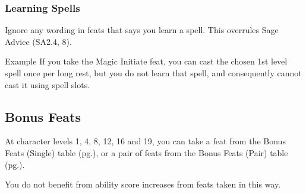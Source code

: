 \documentclass[House_Rules.tex]{subfiles}
\begin{document}
\subsubsection{Learning Spells}
Ignore any wording in feats that says you learn a spell. This overrules Sage Advice (SA2.4, 8).

\begin{DndComment}{Example}
If you take the Magic Initiate feat, you can cast the chosen 1st level spell once per long rest, but you do not learn that spell, and consequently cannot cast it using spell slots.
\end{DndComment}

\subsection{Bonus Feats}
At character levels 1, 4, 8, 12, 16 and 19, you can take a feat from the Bonus Feats (Single) table (pg.\pageref{bonusFeatsSingleTable}), or a pair of feats from the Bonus Feats (Pair) table (pg.\pageref{bonusFeatsPairTable}). 

You do not benefit from ability score increases from feats taken in this way.
\end{document}
